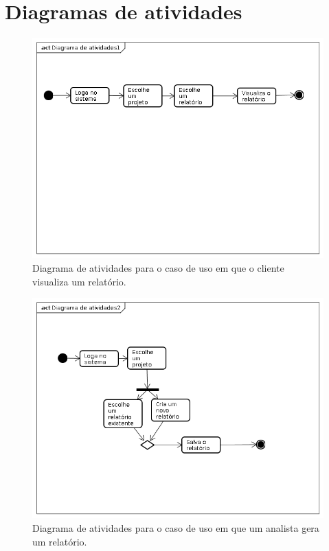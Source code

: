 \chapter{Diagramas de atividades}

\begin{figure}[hb]
    \begin{center}
        \includegraphics[scale=0.5]{img/atividade1.png}
        \caption{Diagrama de atividades para o caso de uso em que o
            cliente visualiza um relatório.}
        \label{fig:atividade-visualiza}
    \end{center}
\end{figure}

\begin{figure}[hb]
    \begin{center}
        \includegraphics[scale=0.5]{img/atividade2.png}
        \caption{Diagrama de atividades para o caso de uso em que um
            analista gera um relatório.}
        \label{fig:atividade-analisa}
    \end{center}
\end{figure}

